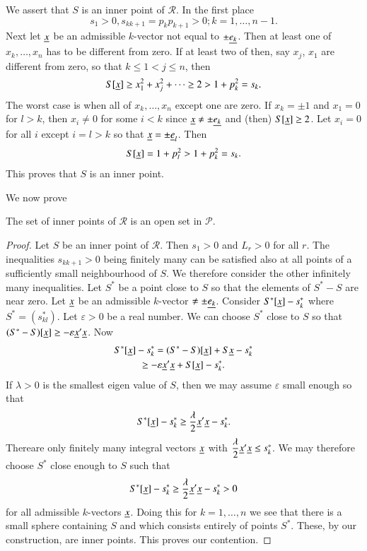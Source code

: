 We assert that $S$ is an inner point of $\mathscr{R}$. In the first
place
$$
s_{1}>0, s_{kk+1}=p_{k}p_{k+1}>0; k=1,\ldots,n-1.
$$
Next let $\underline{x}$ be an admissible $k$-vector not equal to $\pm
\underline{e_{k}}$. Then at least one of $x_{k},\ldots,x_{n}$ has to be
different from zero. If at least two of then, say $x_{j}$, $x_{1}$ are
different from zero, so that $k\leq 1<j\leq n$, then 
$$
S[\underline{x}]\geq x^{2}_{1}+x_{j}^{2}+\cdots\geq 2>1+p_{k}^{2}=s_{k}.
$$\pageoriginale 
The worst case is when all of $x_{k},\ldots,x_{n}$ except one are
zero. If $x_{k}=\pm 1$ and $x_{1}=0$ for $l>k$, then $x_{i}\neq 0$ for
some $i<k$ since $\underline{x}\neq \pm \underline{e_{k}}$ and (then) $S[\underline{x}]\geq
2$. Let $x_{i}=0$ for all $i$ except $i=l>k$ so that
$\underline{x}=\pm\underline{e}_{l}$. Then
$$
S[\underline{x}]=1+p^{2}_{l} > 1 + p^{2}_{k}=s_{k}.
$$
This proves that $S$ is an inner point. 

We now prove

\begin{thm}\label{chap2:thm6}
The set of inner points of $\mathscr{R}$ is an open set in $\mathscr{P}$.
\end{thm}

\begin{proof}
Let $S$ be an inner point of $\mathscr{R}$. Then $s_{1}>0$ and
$L_{r}>0$ for all $r$. The inequalities $s_{kk+1}>0$ being finitely
many can be satisfied also at all points of a sufficiently small
neighbourhood of $S$. We therefore consider the other infinitely many
inequalities. Let $S^{\ast}$ be a point close to $S$ so that the
elements of $S^{\ast}-S$ are near zero. Let $\underline{x}$ be an admissible
$k$-vector $\neq \pm \underline{e_{k}}$. Consider
$S^{\ast}[\underline{x}]-s^{\ast}_{k}$ where $S^{\ast}=(s^{\ast}_{kl})$. Let
$\varepsilon>0$ be a real number. We can choose $S^{\ast}$ close to $S$
so that $(S^{\ast}-S)[\underline{x}]\geq -\varepsilon\underline{x}'\underline{x}$. Now
\begin{gather*}
S^{\ast}[\underline{x}]-s^{\ast}_{k}=(S^{\ast}-S)[\underline{x}]+S\underline{x}-s^{\ast}_{k}\\
\geq -\varepsilon\underline{x}'\underline{x}+S[\underline{x}]-s^{\ast}_{k}. 
\end{gather*}
If $\lambda>0$ is the smallest eigen value of $S$, then we may assume
$\varepsilon$ small enough so that
$$
S^{\ast}[\underline{x}]-s^{\ast}_{k}\geq
\frac{\lambda}{2}\underline{x}'\underline{x}-s^{\ast}_{k}.
$$
There\pageoriginale are only finitely many integral vectors $\underline{x}$
with $\dfrac{\lambda}{2}\underline{x}'\underline{x}\leq s^{\ast}_{k}$. We may
therefore choose $S^{\ast}$ close enough to $S$ such that
$$
S^{\ast}[\underline{x}]-s^{\ast}_{k}\geq
\frac{\lambda}{2}\underline{x}'\underline{x}-s^{\ast}_{k}>0 
$$
for all admissible $k$-vectors $\underline{x}$. Doing this for $k=1,\ldots,n$
we see that there is a small sphere containing $S$ and which consists
entirely of points $S^{\ast}$. These, by our construction, are inner
points. This proves our contention.
\end{proof}

